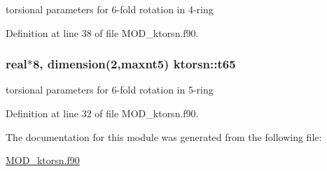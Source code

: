 torsional parameters for 6-\/fold rotation in 4-\/ring 



Definition at line 38 of file M\-O\-D\-\_\-ktorsn.\-f90.

\hypertarget{classktorsn_a9b6d6b807ba85aa929a34f59935d6aff}{
\subsubsection[{t65}]{\setlength{\rightskip}{0pt plus 5cm}real$\ast$8, dimension(2,{\bf maxnt5}) ktorsn\-::t65}}\label{classktorsn_a9b6d6b807ba85aa929a34f59935d6aff}


torsional parameters for 6-\/fold rotation in 5-\/ring 



Definition at line 32 of file M\-O\-D\-\_\-ktorsn.\-f90.



The documentation for this module was generated from the following file\-:\begin{DoxyCompactItemize}
\item 
\hyperlink{MOD__ktorsn_8f90}{M\-O\-D\-\_\-ktorsn.\-f90}\end{DoxyCompactItemize}

